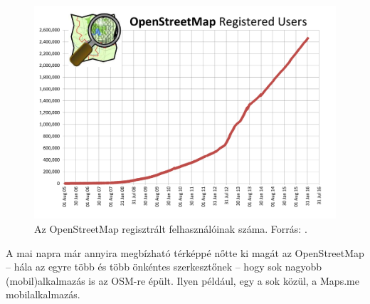 \documentclass[a4paper,12pt]{report}
\begin{document}
\begin{figure}[h]
\centerline{
\includegraphics[width=4.5in]{img/osmusers}}
\caption{Az OpenStreetMap regisztrált felhasználóinak száma. Forrás: \cite{osmhistory}.}
\label{osmusers}
\end{figure}

A mai napra már annyira megbízható térképpé nőtte ki magát az OpenStreetMap -- hála az egyre több és több önkéntes szerkesztőnek -- hogy sok nagyobb (mobil)alkalmazás is az OSM-re épült. Ilyen például, egy a sok közül, a Maps.me \cite{mapsme} mobilalkalmazás.
\end{document}
